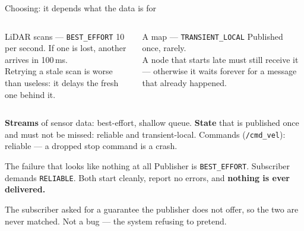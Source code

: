 \documentclass[aspectratio=169]{beamer}
\begin{document}
\begin{frame}{Choosing: it depends what the data is for}
  \small
  \begin{columns}[T,onlytextwidth]
    \begin{block}{\small LiDAR scans --- \texttt{BEST\_EFFORT}}
      \footnotesize
      10 per second. If one is lost, another arrives in 100\,ms.\\[0.3em]
      Retrying a stale scan is worse than useless: it delays the fresh one behind it.
    \end{block}

    \begin{block}{\small A map --- \texttt{TRANSIENT\_LOCAL}}
      \footnotesize
      Published once, rarely.\\[0.3em]
      A node that starts late must still receive it --- otherwise it waits forever for a
      message that already happened.
    \end{block}
  \end{columns}

  \vspace{0.9em}
  \begin{underhood}
    \footnotesize
    \textbf{Streams} of sensor data: best-effort, shallow queue. \textbf{State} that is
    published once and must not be missed: reliable and transient-local. Commands
    (\texttt{/cmd\_vel}): reliable --- a dropped stop command is a crash.
  \end{underhood}
\end{frame}

\begin{frame}[fragile]{The failure that looks like nothing at all}
  \footnotesize
  Publisher is \texttt{BEST\_EFFORT}. Subscriber demands \texttt{RELIABLE}. Both start
  cleanly, report no errors, and \textbf{nothing is ever delivered.}


  \footnotesize
  The subscriber asked for a guarantee the publisher does not offer, so the two are never
  matched. Not a bug --- the system refusing to pretend.
\end{frame}
\end{document}
